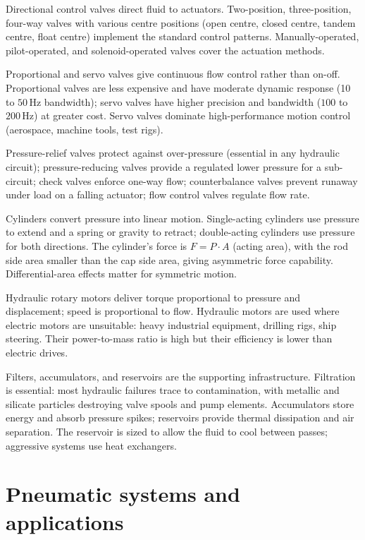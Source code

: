 Directional control valves direct fluid to actuators. Two-position, three-position, four-way valves with various centre positions (open centre, closed centre, tandem centre, float centre) implement the standard control patterns. Manually-operated, pilot-operated, and solenoid-operated valves cover the actuation methods.

Proportional and servo valves give continuous flow control rather than on-off. Proportional valves are less expensive and have moderate dynamic response (10 to $50\,\text{Hz}$ bandwidth); servo valves have higher precision and bandwidth ($100$ to $200\,\text{Hz}$) at greater cost. Servo valves dominate high-performance motion control (aerospace, machine tools, test rigs).

Pressure-relief valves protect against over-pressure (essential in any hydraulic circuit); pressure-reducing valves provide a regulated lower pressure for a sub-circuit; check valves enforce one-way flow; counterbalance valves prevent runaway under load on a falling actuator; flow control valves regulate flow rate.

Cylinders convert pressure into linear motion. Single-acting cylinders use pressure to extend and a spring or gravity to retract; double-acting cylinders use pressure for both directions. The cylinder's force is $F = P \cdot A$ (acting area), with the rod side area smaller than the cap side area, giving asymmetric force capability. Differential-area effects matter for symmetric motion.

Hydraulic rotary motors deliver torque proportional to pressure and displacement; speed is proportional to flow. Hydraulic motors are used where electric motors are unsuitable: heavy industrial equipment, drilling rigs, ship steering. Their power-to-mass ratio is high but their efficiency is lower than electric drives.

Filters, accumulators, and reservoirs are the supporting infrastructure. Filtration is essential: most hydraulic failures trace to contamination, with metallic and silicate particles destroying valve spools and pump elements. Accumulators store energy and absorb pressure spikes; reservoirs provide thermal dissipation and air separation. The reservoir is sized to allow the fluid to cool between passes; aggressive systems use heat exchangers.

\section{Pneumatic systems and applications}

